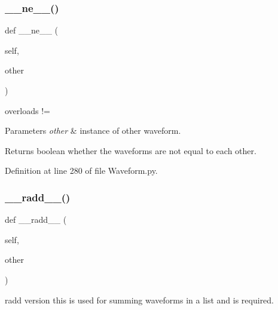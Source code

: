 \subsubsection{\texorpdfstring{\+\_\+\+\_\+ne\+\_\+\+\_\+()}{\_\_ne\_\_()}}
{\footnotesize\ttfamily def \+\_\+\+\_\+ne\+\_\+\+\_\+ (\begin{DoxyParamCaption}\item[{}]{self,  }\item[{}]{other }\end{DoxyParamCaption})}



overloads != 


\begin{DoxyParams}{Parameters}
{\em other} & instance of other waveform. \\
\hline
\end{DoxyParams}
\begin{DoxyReturn}{Returns}
boolean whether the waveforms are not equal to each other. 
\end{DoxyReturn}


Definition at line 280 of file Waveform.\+py.

\mbox{\label{classSignalIntegrity_1_1TimeDomain_1_1Waveform_1_1Waveform_1_1Waveform_a2e098fa2cfaf8d1874cf417836a3329e}} 
\subsubsection{\texorpdfstring{\+\_\+\+\_\+radd\+\_\+\+\_\+()}{\_\_radd\_\_()}}
{\footnotesize\ttfamily def \+\_\+\+\_\+radd\+\_\+\+\_\+ (\begin{DoxyParamCaption}\item[{}]{self,  }\item[{}]{other }\end{DoxyParamCaption})}



radd version this is used for summing waveforms in a list and is required. 


